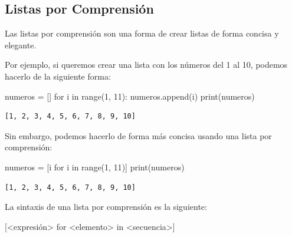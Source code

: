 \documentclass[
  letterpaper,
  DIV=11,
  numbers=noendperiod]{scrreprt}
\newenvironment{Shaded}{\begin{snugshade}}{\end{snugshade}}
\newcommand{\BuiltInTok}[1]{\textcolor[rgb]{0.00,0.23,0.31}{#1}}
\newcommand{\ControlFlowTok}[1]{\textcolor[rgb]{0.00,0.23,0.31}{#1}}
\newcommand{\DecValTok}[1]{\textcolor[rgb]{0.68,0.00,0.00}{#1}}
\newcommand{\KeywordTok}[1]{\textcolor[rgb]{0.00,0.23,0.31}{#1}}
\newcommand{\NormalTok}[1]{\textcolor[rgb]{0.00,0.23,0.31}{#1}}
\newcommand{\OperatorTok}[1]{\textcolor[rgb]{0.37,0.37,0.37}{#1}}
\begin{document}
\subsection{Listas por Comprensión}\label{listas-por-comprensiuxf3n}

Las listas por comprensión son una forma de crear listas de forma
concisa y elegante.

Por ejemplo, si queremos crear una lista con los números del 1 al 10,
podemos hacerlo de la siguiente forma:

\begin{Shaded}
\begin{Highlighting}[]
\NormalTok{numeros }\OperatorTok{=}\NormalTok{ []}
\ControlFlowTok{for}\NormalTok{ i }\KeywordTok{in} \BuiltInTok{range}\NormalTok{(}\DecValTok{1}\NormalTok{, }\DecValTok{11}\NormalTok{):}
\NormalTok{    numeros.append(i)}
\BuiltInTok{print}\NormalTok{(numeros)}
\end{Highlighting}
\end{Shaded}

\begin{verbatim}
[1, 2, 3, 4, 5, 6, 7, 8, 9, 10]
\end{verbatim}

Sin embargo, podemos hacerlo de forma más concisa usando una lista por
comprensión:

\begin{Shaded}
\begin{Highlighting}[]
\NormalTok{numeros }\OperatorTok{=}\NormalTok{ [i }\ControlFlowTok{for}\NormalTok{ i }\KeywordTok{in} \BuiltInTok{range}\NormalTok{(}\DecValTok{1}\NormalTok{, }\DecValTok{11}\NormalTok{)]}
\BuiltInTok{print}\NormalTok{(numeros)}
\end{Highlighting}
\end{Shaded}

\begin{verbatim}
[1, 2, 3, 4, 5, 6, 7, 8, 9, 10]
\end{verbatim}

La sintaxis de una lista por comprensión es la siguiente:

\begin{Shaded}
\begin{Highlighting}[]
\NormalTok{[}\OperatorTok{\textless{}}\NormalTok{expresión}\OperatorTok{\textgreater{}} \ControlFlowTok{for} \OperatorTok{\textless{}}\NormalTok{elemento}\OperatorTok{\textgreater{}} \KeywordTok{in} \OperatorTok{\textless{}}\NormalTok{secuencia}\OperatorTok{\textgreater{}}\NormalTok{]}
\end{Highlighting}
\end{Shaded}
\end{document}
